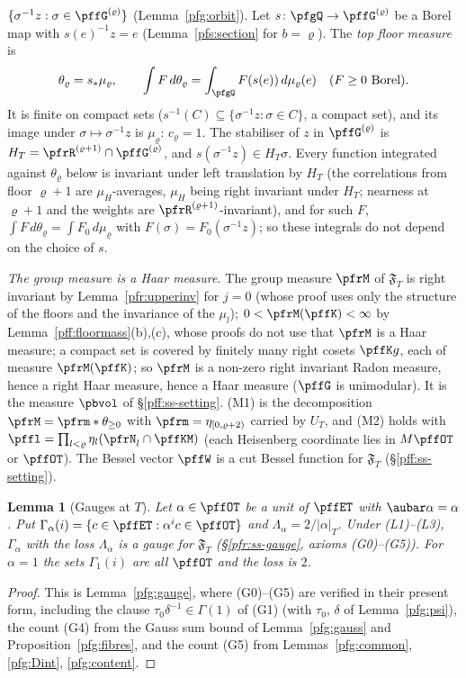 \documentclass[10pt]{amsart}
\newtheorem{lemma}[theorem]{Lemma}
\theoremstyle{definition}
\theoremstyle{remark}
\begin{document}
\begin{itemize}
$\{\sigma^{-1}z:\sigma\in\pffG^{(\varrho)}\}$ (Lemma~\ref{pfg:orbit}). Let $s\colon\pfgQ\to\pffG^{(\varrho)}$ be a Borel map
with $s(e)^{-1}z=e$ (Lemma~\ref{pfs:section} for $b=\varrho$). The \emph{top floor measure} is
\[
\theta_\varrho=s_*\mu_\varrho,\qquad\int F\,d\theta_\varrho=\int_{\pfgQ} F(s(e))\,d\mu_\varrho(e)\quad(F\ge0\text{ Borel}).
\]
It is finite on compact sets ($s^{-1}(C)\subseteq\{\sigma^{-1}z:\sigma\in C\}$, a compact set), and its image under
$\sigma\mapsto\sigma^{-1}z$ is $\mu_\varrho$: $c_\varrho=1$. The stabiliser of $z$ in $\pffG^{(\varrho)}$ is $H_T=\pfrR^{(\varrho+1)}\cap
\pffG^{(\varrho)}$, and $s(\sigma^{-1}z)\in H_T\sigma$. Every function integrated against $\theta_\varrho$ below is invariant under
left translation by $H_T$ (the correlations from floor $\varrho+1$ are $\mu_H$-averages, $\mu_H$ being right invariant
under $H_T$; nearness at $\varrho+1$ and the weights are $\pfrR^{(\varrho+1)}$-invariant), and for such $F$,
$\int F\,d\theta_\varrho=\int F_0\,d\mu_\varrho$ with $F(\sigma)=F_0(\sigma^{-1}z)$; so these integrals do not depend on the
choice of $s$.
\end{itemize}
\emph{The group measure is a Haar measure.} The group measure $\pfrM$ of $\mathfrak F_T$ is right invariant by
Lemma~\ref{pfr:upperinv} for $j=0$ (whose proof uses only the structure of the floors and the invariance of the $\mu_l$);
$0<\pfrM(\pffK)<\infty$ by Lemma~\ref{pff:floormass}(b),(c), whose proofs do not use that $\pfrM$ is a Haar measure; a compact set
is covered by finitely many right cosets $\pffK g$, each of measure $\pfrM(\pffK)$; so $\pfrM$ is a non-zero right invariant
Radon measure, hence a right Haar measure, hence a Haar measure ($\pffG$ is unimodular). It is the measure $\pbvol$ of
\S\ref{pff:ss-setting}. (M1) is the decomposition $\pfrM=\pfrm\ast\theta_{\ge0}$
with $\pfrm=\eta_{[0,\varrho+2)}$ carried by $U_T$, and (M2) holds with $\pffl=\prod_{l<\varrho}
\eta_l(\pfrN_l\cap\pffKM)$ (each Heisenberg coordinate lies in $M\pffOT$ or $\pffOT$).
The Bessel vector $\pffW$ is a cut Bessel function for $\mathfrak F_T$ (\S\ref{pff:ss-setting}).

\begin{lemma}[Gauges at $T$]\label{pff:gauge}
Let $\alpha\in\pffOT$ be a unit of $\pffET$ with $\aubar\alpha=\alpha$. Put $\Gamma_\alpha(i)=\{c\in
\pffET:\alpha^ic\in\pffOT\}$ and $\Lambda_\alpha=2/|\alpha|_T$. Under (L1)--(L3), $\Gamma_\alpha$ with
the loss $\Lambda_\alpha$ is a gauge for $\mathfrak F_T$ (\S\ref{pfr:ss-gauge}, axioms (G0)--(G5)). For
$\alpha=1$ the sets $\Gamma_1(i)$ are all $\pffOT$ and the loss is $2$.
\end{lemma}
\begin{proof}
This is Lemma~\ref{pfg:gauge}, where (G0)--(G5) are verified in their present form, including the clause
$\tau_0\delta^{-1}\in\Gamma(1)$ of (G1) (with $\tau_0$, $\delta$ of Lemma~\ref{pfg:psi}), the count (G4) from the
Gauss sum bound of Lemma~\ref{pfg:gauss} and Proposition~\ref{pfg:fibres}, and the count (G5) from
Lemmas~\ref{pfg:common}, \ref{pfg:Dint}, \ref{pfg:content}.
\end{proof}
\end{document}
